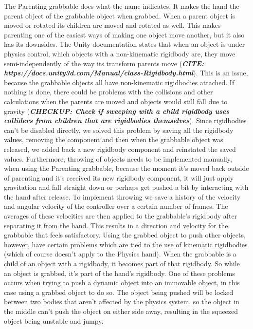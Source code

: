 The Parenting grabbable does what the name indicates. It makes the hand the parent object of the grabbable object when grabbed. When a parent object is moved or rotated its children are moved and rotated as well. This makes parenting one of the easiest ways of making one object move another, but it also has its downsides. The Unity documentation states that when an object is under physics control, which objects with a non-kinematic rigidbody are, they move semi-independently of the way its transform parents move (\textbf{\textit{CITE: https://docs.unity3d.com/Manual/class-Rigidbody.html}}). This is an issue, because the grabbable objects all have non-kinematic rigidbodies attached. If nothing is done, there could be problems with the collisions and other calculations when the parents are moved and objects would still fall due to gravity (\textbf{\textit{CHECKUP: Check if sweeping with a child rigidbody uses colliders from children that are rigidbodies themselves}}). Since rigidbodies can't be disabled directly, we solved this problem by saving all the rigidbody values, removing the component and then when the grabbable object was released, we added back a new rigidbody component and reinstated the saved values. Furthermore, throwing of objects needs to be implemented manually, when using the Parenting grabbable, because the moment it's moved back outside of parenting and it's received its new rigidbody component, it will just apply gravitation and fall straight down or perhaps get pushed a bit by interacting with the hand after release. To implement throwing we save a history of the velocity and angular velocity of the controller over a certain number of frames. The averages of these velocities are then applied to the grabbable's rigidbody after separating it from the hand. This results in a direction and velocity for the grabbable that feels satisfactory. Using the grabbed object to push other objects, however, have certain problems which are tied to the use of kinematic rigidbodies (which of course doesn't apply to the Physics hand). When the grabbable is a child of an object with a rigidbody, it becomes part of that rigidbody. So while an object is grabbed, it's part of the hand's rigidbody. One of these problems occurs when trying to push a dynamic object into an immovable object, in this case using a grabbed object to do so. The object being pushed will be locked between two bodies that aren't affected by the physics system, so the object in the middle can't push the object on either side away, resulting in the squeezed object being unstable and jumpy.

